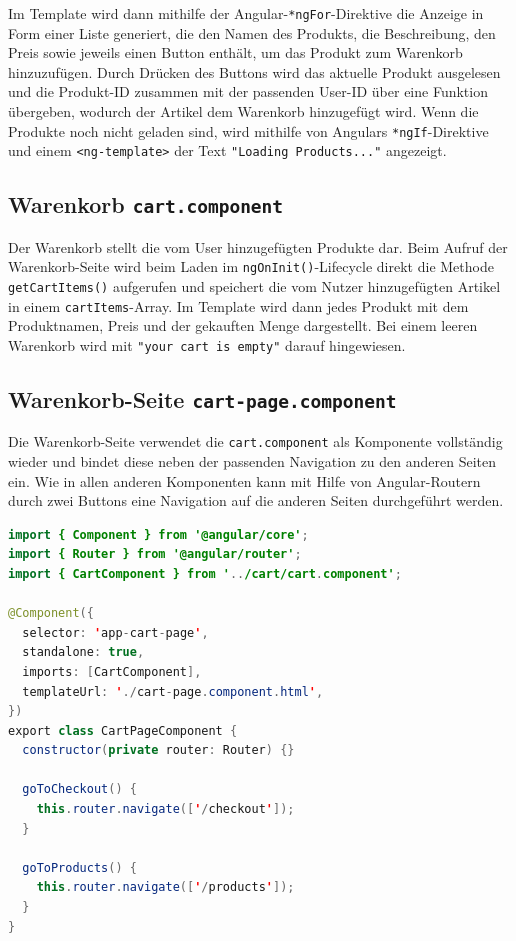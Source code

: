 \documentclass[oneside]{ausarbeitung}
\begin{document}
Im Template wird dann mithilfe der Angular-\texttt{*ngFor}-Direktive die Anzeige in Form einer Liste generiert, die den Namen des Produkts, die Beschreibung, den Preis sowie jeweils einen Button enthält, um das Produkt zum Warenkorb hinzuzufügen.
Durch Drücken des Buttons wird das aktuelle Produkt ausgelesen und die Produkt-ID zusammen mit der passenden User-ID über eine Funktion übergeben, wodurch der Artikel dem Warenkorb hinzugefügt wird.
Wenn die Produkte noch nicht geladen sind, wird mithilfe von Angulars \texttt{*ngIf}-Direktive und einem \texttt{<ng-template>} der Text \texttt{"Loading Products..."} angezeigt.


\subsection{Warenkorb \texttt{cart.component}}

Der Warenkorb stellt die vom User hinzugefügten Produkte dar. Beim Aufruf der Warenkorb-Seite wird beim Laden im \texttt{ngOnInit()}-Lifecycle direkt die Methode \texttt{getCartItems()} aufgerufen und speichert die vom Nutzer hinzugefügten Artikel in einem \texttt{cartItems}-Array. Im Template wird dann jedes Produkt mit dem Produktnamen, Preis und der gekauften Menge dargestellt. Bei einem leeren Warenkorb wird mit \texttt{"your cart is empty"} darauf hingewiesen.

\subsection{Warenkorb-Seite \texttt{cart-page.component}}

Die Warenkorb-Seite verwendet die \texttt{cart.component} als Komponente vollständig wieder und bindet diese neben der passenden Navigation zu den anderen Seiten ein. Wie in allen anderen Komponenten kann mit Hilfe von Angular-Routern durch zwei Buttons eine Navigation auf die anderen Seiten durchgeführt werden.

\begin{lstlisting}[language=Java, caption={Auszug aus der \texttt{CartPageComponent}}, label={lst:cart-page-component}]
import { Component } from '@angular/core';
import { Router } from '@angular/router';
import { CartComponent } from '../cart/cart.component';

@Component({
  selector: 'app-cart-page',
  standalone: true,
  imports: [CartComponent],
  templateUrl: './cart-page.component.html',
})
export class CartPageComponent {
  constructor(private router: Router) {}

  goToCheckout() {
    this.router.navigate(['/checkout']);
  }

  goToProducts() {
    this.router.navigate(['/products']);
  }
}
\end{lstlisting}
\end{document}
